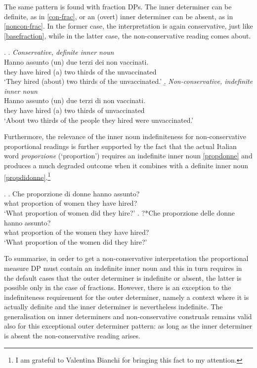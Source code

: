 \documentclass[charis, linguex]{glossa}
\begin{document}
The same pattern is found with fraction DPs. The inner determiner can be definite, as in \ref{con-frac}, or an (overt) inner determiner can be absent, as in \ref{noncon-frac}. In the former case, the interpretation is again conservative, just like \ref{basefraction}, while in the latter case, the non-conservative reading comes about.

\ex. \a. \textit{Conservative, definite inner noun} \\
    \gll Hanno assunto (un) due terzi dei {non vaccinati}.   \\
	  {they have} hired (a) two thirds {of the} unvaccinated \\
	\glt   `They hired (about) two thirds of the unvaccinated.' \label{con-frac} 
\b. \textit{Non-conservative, indefinite inner noun} \\
     \gll Hanno assunto (un) due terzi di {non vaccinati}.     \\ 
	  {they have} hired (a) two thirds of unvaccinated \\
	\glt   `About two thirds of the people they hired were unvaccinated.' \label{noncon-frac}
	
	
Furthermore, the relevance of the inner noun indefiniteness for non-conservative proportional readings is further supported by the fact that the actual Italian word \textit{proporzione} (`proportion') requires an indefinite inner noun \ref{propdonne} and produces a much degraded outcome when it combines with a definite inner noun \ref{propdidonne}.\footnote{I am grateful to Valentina Bianchi for bringing this fact to my attention.} 
 
\ex. \ag. Che proporzione di donne hanno assunto? \\
      what proportion of women {they have} hired?  \\
     \glt   `What proportion of women did they hire?' \label{propdonne}
	 \bg. ?*Che proporzione delle donne hanno assunto? \\
      what proportion {of the} women {they have} hired? \\
     \glt  `What proportion of the women did they hire?'\label{propdidonne}
	
	
To summarise, in order to get a non-conservative interpretation the proportional measure DP must contain an indefinite inner noun and this in turn requires in the default cases that the outer determiner is indefinite or absent, the latter is possible only in the case of fractions. However, there is an exception to the indefiniteness requirement for the outer determiner, namely a context where it is actually definite and the inner determiner is nevertheless indefinite. The generalisation on inner determiners and non-conservative construals remains valid also for this exceptional outer determiner pattern: as long as the inner determiner is absent the non-conservative reading arises.
\end{document}
